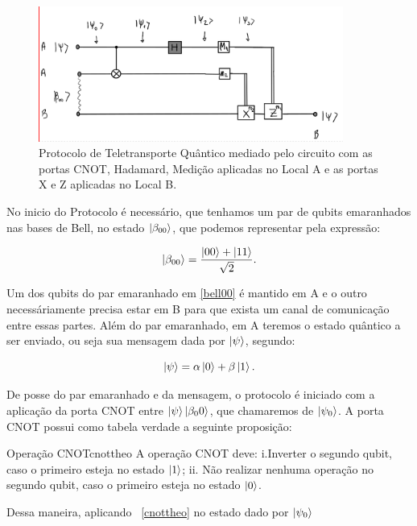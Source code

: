 \begin{figure}
\centering
\includegraphics[width=10cm]{PROTOCOLOTELETRANSPORTE.png}
\caption{Protocolo de Teletransporte Quântico mediado pelo circuito com as portas CNOT, Hadamard, Medição aplicadas no Local A e as portas X e Z aplicadas no Local B.}\label{protocoloteletransporte}
\end{figure}

No inicio do Protocolo é necessário, que tenhamos um par de qubits emaranhados nas bases de Bell, no estado $\ket{\beta_{00}}$, que podemos representar pela expressão:

\begin{equation}\label{bell00}
 \ket{\beta_{00}} = \frac{\ket{00} + \ket{11}} {\sqrt{2}}.
\end{equation}

Um dos qubits do par emaranhado em \ref{bell00} é mantido em A e o outro necessáriamente precisa estar em B para que exista um canal de comunicação entre essas partes. Além do par emaranhado, em A teremos o estado quântico a ser enviado, ou seja sua mensagem dada por $\ket{\psi}$, segundo:

\begin{equation}\label{psi}
 \ket{\psi} = \alpha \ket{0} + \beta \ket{1}.
\end{equation}

De posse do par emaranhado e da mensagem, o protocolo é iniciado com a aplicação da porta CNOT entre $\ket{\psi}\ket{\beta_00}$, que chamaremos de $\ket{\psi_0}$. A porta CNOT possui como tabela verdade a seguinte proposição:

\begin{theo}{Operação CNOT}{cnottheo}
A operação CNOT deve: i.Inverter o segundo qubit, caso o primeiro esteja no estado $\ket{1}$; ii. Não realizar nenhuma operação no segundo qubit, caso o primeiro esteja no estado $\ket{0}$.
\end{theo}

Dessa maneira, aplicando ~\ref{cnottheo} no estado dado por $\ket{\psi_0}$

